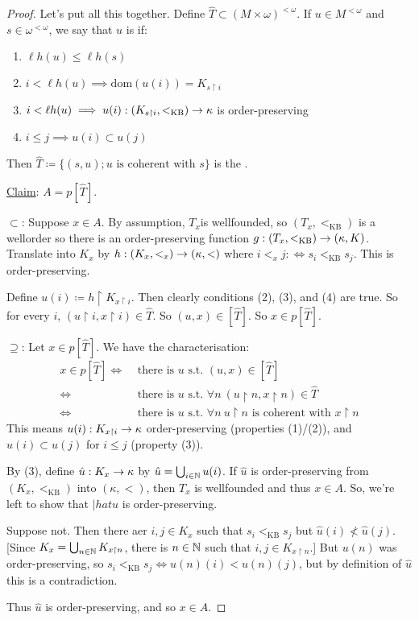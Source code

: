 \documentclass[]{article}
\newcommand{\om}{\omega}
\newcommand{\lom}{{<\omega}}
\newcommand{\lh}{\ell h}
\newcommand{\lkb}{<_{\textrm{KB}}}
\newcommand{\dom}{\textrm{dom}}
\begin{document}
\begin{proof}
    Let's put all this together. Define $\hat{T} \subset (M\times\om)^\lom$. If $u \in M^\lom$ and $s \in \om^\lom$, we say that $u$ is  if:
    \begin{enumerate}[label = (\arabic*)]
        \item $\lh(u)\le\lh(s)$
        \item $i < \lh(u)\implies \dom(u(i)) = K_{s\restriction i}$
        \item $i < \lh(u) \implies u(i) : (K_{s\restriction i},\lkb)\ra \kappa$ is order-preserving
        \item $i\le j \implies u(i)\subset u(j)$
    \end{enumerate}
    Then $\hat{T}\coloneqq \{(s,u);u\textrm{ is coherent with }s\}$ is the .

    \underline{Claim}: $A = p[\hat{T}]$.

    \underline{$\subset$}: Suppose $x \in A$. By assumption, $T_x$is wellfounded, so $(T_x,\lkb)$ is a wellorder so there is an order-preserving function $g: (T_x,\lkb)\ra(\kappa,K)$. Translate into $K_x$ by $h:(K_x,<_x)\rightarrow(\kappa,<)$ where $i<_xj :\iff s_i \lkb s_j$. This is order-preserving.

    Define $u(i)\coloneqq h\restriction K_{x\restriction i}$. Then clearly conditions (2), (3), and (4) are true. So for every $i$, $(u\restriction i,x\restriction i)\in \hat{T}$. So $(u,x)\in [\hat{T}]$. So $x \in p[\hat{T}]$.


    \underline{$\supseteq$}: Let $x \in p[\hat{T}]$. We have the characterisation:
    \begin{align*}
        x \in p[\hat{T}] \iff & \textrm{ there is }u\textrm{ s.t. }(u,x)\in[\hat{T}]\\
        \iff&\textrm{ there is }u\textrm{ s.t. }\forall n\ (u\restriction n,x\restriction n)\in\hat{T}\\
        \iff&\textrm{ there is }u\textrm{ s.t. }\forall n\ u\restriction n\textrm{ is coherent with }x\restriction n
    \end{align*}
    This means $u(i) : K_{x\restriction i}\rightarrow \kappa$ order-preserving (properties (1)/(2)), and $u(i)\subset u(j)$ for $i\le j$ (property (3)).

    By (3), define $\hat{u} : K_x \rightarrow \kappa$ by $\hat{u} = \bigcup_{i\in\mathbb{N}}u(i)$. If $\hat{u}$ is order-preserving from $(K_x,\lkb)$ into $(\kappa,<)$, then $T_x$ is wellfounded and thus $x \in A$. So, we're left to show that $|hat{u}$ is order-preserving.

    Suppose not. Then there aer $i,j\in K_x$ such that $s_i \lkb s_j$ but $\hat{u}(i)\not<\hat{u}(j)$. [Since $K_x = \bigcup_{n\in\mathbb{N}}K_{x\restriction n}$, there is $n\in\mathbb{N}$ such that $i,j \in K_{x\restriction n}$.] But $u(n)$ was order-preserving, so $s_i \lkb s_j \iff u(n)(i) < u(n)(j)$, but by definition of $\hat{u}$ this is a contradiction.

    Thus $\hat{u}$ is order-preserving, and so $x \in A$.
\end{proof}
\end{document}
